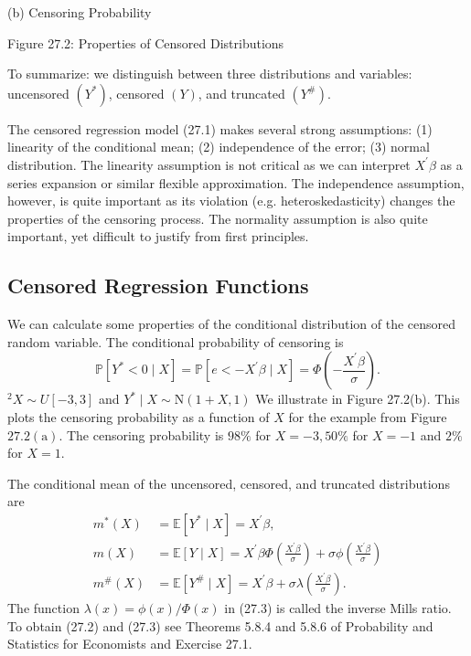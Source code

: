 \documentclass[10pt]{article}
\begin{document}
(b) Censoring Probability

Figure 27.2: Properties of Censored Distributions

To summarize: we distinguish between three distributions and variables: uncensored $\left(Y^{*}\right)$, censored $(Y)$, and truncated $\left(Y^{\#}\right)$.

The censored regression model (27.1) makes several strong assumptions: (1) linearity of the conditional mean; (2) independence of the error; (3) normal distribution. The linearity assumption is not critical as we can interpret $X^{\prime} \beta$ as a series expansion or similar flexible approximation. The independence assumption, however, is quite important as its violation (e.g. heteroskedasticity) changes the properties of the censoring process. The normality assumption is also quite important, yet difficult to justify from first principles.

\subsection{Censored Regression Functions}
We can calculate some properties of the conditional distribution of the censored random variable. The conditional probability of censoring is
$$
\mathbb{P}\left[Y^{*}<0 \mid X\right]=\mathbb{P}\left[e<-X^{\prime} \beta \mid X\right]=\Phi\left(-\frac{X^{\prime} \beta}{\sigma}\right) .
$$
${ }^{2} X \sim U[-3,3]$ and $Y^{*} \mid X \sim \mathrm{N}(1+X, 1)$ We illustrate in Figure 27.2(b). This plots the censoring probability as a function of $X$ for the example from Figure $27.2(\mathrm{a})$. The censoring probability is $98 \%$ for $X=-3,50 \%$ for $X=-1$ and $2 \%$ for $X=1$.

The conditional mean of the uncensored, censored, and truncated distributions are
$$
\begin{aligned}
m^{*}(X) &=\mathbb{E}\left[Y^{*} \mid X\right]=X^{\prime} \beta, \\
m(X) &=\mathbb{E}[Y \mid X]=X^{\prime} \beta \Phi\left(\frac{X^{\prime} \beta}{\sigma}\right)+\sigma \phi\left(\frac{X^{\prime} \beta}{\sigma}\right) \\
m^{\#}(X) &=\mathbb{E}\left[Y^{\#} \mid X\right]=X^{\prime} \beta+\sigma \lambda\left(\frac{X^{\prime} \beta}{\sigma}\right) .
\end{aligned}
$$
The function $\lambda(x)=\phi(x) / \Phi(x)$ in (27.3) is called the inverse Mills ratio. To obtain (27.2) and (27.3) see Theorems 5.8.4 and 5.8.6 of Probability and Statistics for Economists and Exercise 27.1.
\end{document}
